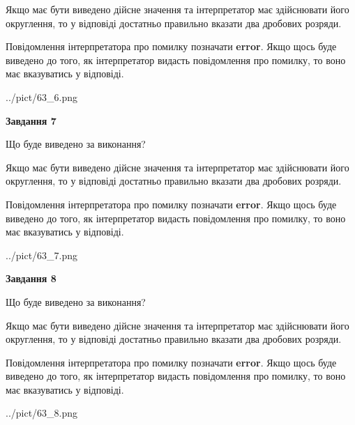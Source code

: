 \documentclass[12pt, ukrainian]{article}
\begin{document}
{\begin {Large}
Якщо має бути виведено дійсне значення та інтерпретатор має здійснювати його округлення, 
то у відповіді достатньо правильно вказати два дробових розряди.

Повідомлення інтерпретатора про помилку позначати \textbf{error}.
Якщо щось буде виведено до того, як інтерпретатор видасть повідомлення про помилку, 
то воно має вказуватись у відповіді. \par

\begin{center}
	{../pict/63_6.png}
\end{center}
\newpage

{\begin {center}\textbf{Завдання 7}\end {center}}\par
Що буде виведено за виконання? \par

Якщо має бути виведено дійсне значення та інтерпретатор має здійснювати його округлення, 
то у відповіді достатньо правильно вказати два дробових розряди.

Повідомлення інтерпретатора про помилку позначати \textbf{error}.
Якщо щось буде виведено до того, як інтерпретатор видасть повідомлення про помилку, 
то воно має вказуватись у відповіді. \par

\begin{center}
	{../pict/63_7.png}
\end{center}
\newpage

{\begin {center}\textbf{Завдання 8}\end {center}}\par
Що буде виведено за виконання? \par

Якщо має бути виведено дійсне значення та інтерпретатор має здійснювати його округлення, 
то у відповіді достатньо правильно вказати два дробових розряди.

Повідомлення інтерпретатора про помилку позначати \textbf{error}.
Якщо щось буде виведено до того, як інтерпретатор видасть повідомлення про помилку, 
то воно має вказуватись у відповіді. \par

\begin{center}
	{../pict/63_8.png}
\end{center}
\newpage


\end{Large}}
\end{document}
